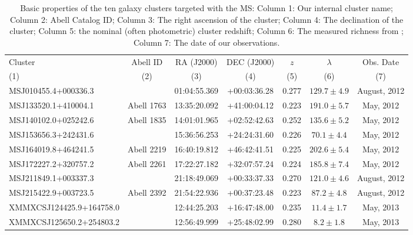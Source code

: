 \begin{landscape}
	\begin{table}
	\caption[Basic properties of the ten galaxy clusters targeted with the MS.]{Basic properties of the ten galaxy clusters targeted with the MS: Column 1: Our internal cluster name; Column 2: Abell Catalog ID; Column 3: The right ascension of the cluster; Column 4: The declination of the cluster; Column 5: the nominal (often photometric) cluster redshift; Column 6: The measured richness from \cite{Rykoff2012}; Column 7: The date of our observations.}
	\begin{centering} 
	\begin{tabular}{lcccccc} 
		\hline 
		Cluster & Abell ID & RA (J2000) & DEC (J2000) & $z$ & $\lambda$ & Obs. Date\\
		(1) & (2) & (3) & (4) & (5) & (6) & (7) \\
		\hline \hline
		MSJ010455.4+000336.3 & \nd & 01:04:55.369 & +00:03:36.28 & 0.277 & $129.7\pm4.9$ & August, 2012 \\
		MSJ133520.1+410004.1 & Abell 1763 & 13:35:20.092 & +41:00:04.12 & 0.223 & $191.0\pm5.7$ & May, 2012 \\
		MSJ140102.0+025242.6 & Abell 1835 & 14:01:01.965 & +02:52:42.63 & 0.252 & $135.6\pm5.2$ & May, 2012 \\
		MSJ153656.3+242431.6 & \nd & 15:36:56.253 & +24:24:31.60 & 0.226 & $70.1\pm4.4$ & May, 2012 \\ 
		MSJ164019.8+464241.5 & Abell 2219 & 16:40:19.812 & +46:42:41.51 & 0.225 & $202.6\pm5.4$ & May, 2012 \\
		MSJ172227.2+320757.2 & Abell 2261 & 17:22:27.182 & +32:07:57.24 & 0.224 & $185.8\pm7.4$ & May, 2012 \\
		MSJ211849.1+003337.3 & \nd & 21:18:49.069 & +00:33:37.33 & 0.270 & $121.0\pm4.6$ & August, 2012 \\
		MSJ215422.9+003723.5 & Abell 2392 & 21:54:22.936 & +00:37:23.48 & 0.223 & $87.2\pm4.8$ & August, 2012\\
		XMMXCSJ124425.9+164758.0 & \nd & 12:44:25.203 & +16:47:48.00 & 0.235 & $11.4\pm1.7$ & May, 2013 \\
		XMMXCSJ125650.2+254803.2 & \nd & 12:56:49.999 & +25:48:02.99 & 0.280 & $8.2\pm1.8$ & May, 2013 \\
		\hline 
		\end{tabular}
	\end{centering}
		\label{2tbl:targets} 
	\end{table}
\end{landscape}

